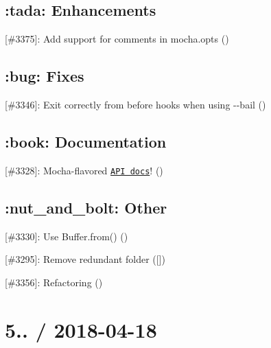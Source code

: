 \subsection*{\+:tada\+: Enhancements}


\begin{DoxyItemize}
\item \mbox{[}\#3375\mbox{]}\+: Add support for comments in {\ttfamily mocha.\+opts} (\href{https://github.com/plroebuck}{\tt })
\end{DoxyItemize}

\subsection*{\+:bug\+: Fixes}


\begin{DoxyItemize}
\item \mbox{[}\#3346\mbox{]}\+: Exit correctly from {\ttfamily before} hooks when using {\ttfamily -\/-\/bail} (\href{https://github.com/outsideris}{\tt })
\end{DoxyItemize}

\subsection*{\+:book\+: Documentation}


\begin{DoxyItemize}
\item \mbox{[}\#3328\mbox{]}\+: Mocha-\/flavored \href{https://mochajs.org/api/}{\tt A\+PI docs}! (\href{https://github.com/munter}{\tt })
\end{DoxyItemize}

\subsection*{\+:nut\+\_\+and\+\_\+bolt\+: Other}


\begin{DoxyItemize}
\item \mbox{[}\#3330\mbox{]}\+: Use {\ttfamily Buffer.\+from()} (\href{https://github.com/harrysarson}{\tt })
\item \mbox{[}\#3295\mbox{]}\+: Remove redundant folder (\mbox{[}\mbox{]})
\item \mbox{[}\#3356\mbox{]}\+: Refactoring (\href{https://github.com/plroebuck}{\tt })
\end{DoxyItemize}

\section*{5.. / 2018-\/04-\/18}

